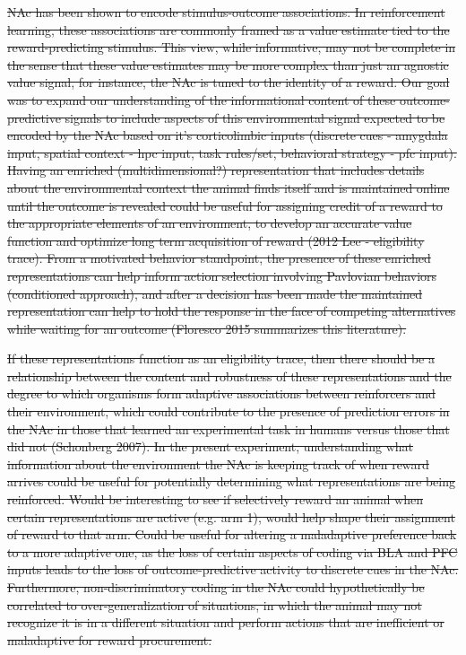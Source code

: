 \documentclass[11pt]{article}
\providecommand{\DIFdel}[1]{{\protect\color{red}\sout{#1}}}                      %
\begin{document}
{%
\DIFdel{NAc has been shown to encode stimulus-outcome associations. In reinforcement learning, these associations are commonly framed as a value estimate tied to the reward-predicting stimulus. This view, while informative, may not be complete in the sense that these value estimates may be more complex than just an agnostic value signal, for instance, the NAc is tuned to the identity of a reward. Our goal was to expand our understanding of the informational content of these outcome-predictive signals to include aspects of this environmental signal expected to be encoded by the NAc based on it’s corticolimbic inputs (discrete cues - amygdala input, spatial context - hpc input, task rules/set, behavioral strategy - pfc input). Having an enriched (multidimensional?) representation that includes details about the environmental context the animal finds itself and is maintained online until the outcome is revealed could be useful for assigning credit of a reward to the appropriate elements of an environment, to develop an accurate value function and optimize long term acquisition of reward (2012 Lee - eligibility trace). From a motivated behavior standpoint, the presence of these enriched representations can help inform action selection involving Pavlovian behaviors (conditioned approach), and after a decision has been made the maintained representation can help to hold the response in the face of competing alternatives while waiting for an outcome (Floresco 2015 summarizes this literature). 
}%

\DIFdel{If these representations function as an eligibility trace, then there should be a relationship between the content and robustness of these representations and the degree to which organisms form adaptive associations between reinforcers and their environment, which could contribute to the presence of prediction errors in the NAc in those that learned an experimental task in humans versus those that did not (Schonberg 2007). In the present experiment, understanding what information about the environment the NAc is keeping track of when reward arrives could be useful for potentially determining what representations are being reinforced. Would be interesting to see if selectively reward an animal when certain representations are active (e.g. arm 1), would help shape their assignment of reward to that arm. Could be useful for altering a maladaptive preference back to a more adaptive one, as the loss of certain aspects of coding via BLA and PFC inputs leads to the loss of outcome-predictive activity to discrete cues in the NAc. Furthermore, non-discriminatory coding in the NAc could hypothetically be correlated to over-generalization of situations, in which the animal may not recognize it is in a different situation and perform actions that are inefficient or maladaptive for reward procurement.  
}%

}
\end{document}
